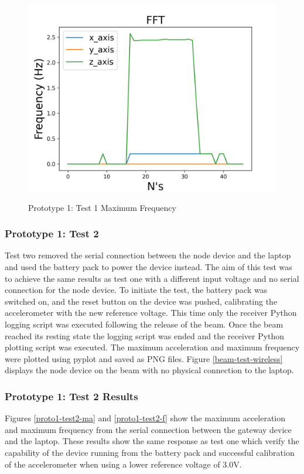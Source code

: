 \begin{figure}[H]
	\centering
	\caption{Prototype 1: Test 1 Maximum Frequency}
	\includegraphics[width=.9\textwidth]{Sections/Prototype-Testing/PosterF.png}
	\label{proto1-test1-f}
\end{figure}

\subsubsection{Prototype 1: Test 2}
Test two removed the serial connection between the node device and the laptop and used the battery pack to power the device instead. The aim of this test was to achieve the same results as test one with a different input voltage and no serial connection for the node device. To initiate the test, the battery pack was switched on, and the reset button on the device was pushed, calibrating the accelerometer with the new reference voltage. This time only the receiver Python logging script was executed following the release of the beam. Once the beam reached its resting state the logging script was ended and the receiver Python plotting script was executed. The maximum acceleration and maximum frequency were plotted using pyplot and saved as PNG files. Figure \ref{beam-test-wireless} displays the node device on the beam with no physical connection to the laptop. 

\subsubsection{Prototype 1: Test 2 Results}
Figures \ref{proto1-test2-ma} and \ref{proto1-test2-f} show the maximum acceleration and maximum frequency from the serial connection between the gateway device and the laptop. These results show the same response as test one which verify the capability of the device running from the battery pack and successful calibration of the accelerometer when using a lower reference voltage of 3.0V. 

